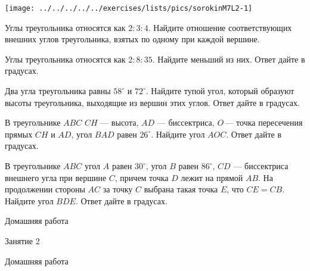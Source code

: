 \begin{class}[number=1]
\begin{listofex}
\begin{minipage}[t]{\picwidth}
			\texttt{[image: ../../../../../exercises/lists/pics/sorokinM7L2-1]}
		\end{minipage} 
		\item Углы треугольника относятся как \( 2:3:4 \). Найдите отношение соответствующих внешних углов треугольника,
		взятых по одному при каждой вершине.
		\item Углы треугольника относятся как \(  2:8:35 \). Найдите меньший из них. Ответ дайте в градусах.
		\item Два угла треугольника равны \( 58^{\circ} \) и \( 72^{\circ} \). Найдите тупой угол, который образуют высоты треугольника, выходящие из вершин этих углов. Ответ дайте в градусах.
		\item В треугольнике \( ABC \) \( CH \)  — высота, \( AD \)  — биссектриса, \( O \) — точка пересечения прямых \( CH \) и \( AD \), угол \( BAD \) равен \( 26^{\circ} \). Найдите угол \( AOC \). Ответ дайте в градусах.
		\item В треугольнике \( ABC \) угол \( A \) равен \( 30^{\circ} \), угол \( B \) равен \( 86^{\circ} \), \( CD \)  — биссектриса внешнего угла при вершине \( C \), причем точка \( D \) лежит на прямой \( AB \). На продолжении стороны \( AC \) за точку \( C  \) выбрана такая точка \( E \), что \( CE  =  CB \). Найдите угол \( BDE \). Ответ дайте в градусах.
	\end{listofex}
\end{class}

\begin{homework}[number=1]
	\begin{listofex}
		\item Домашняя работа
	\end{listofex}
\end{homework}

\begin{class}[number=2]
	\begin{listofex}
		\item Занятие 2
	\end{listofex}
\end{class}

\begin{homework}[number=2]
	\begin{listofex}
		\item Домашняя работа
	\end{listofex}
\end{homework}


